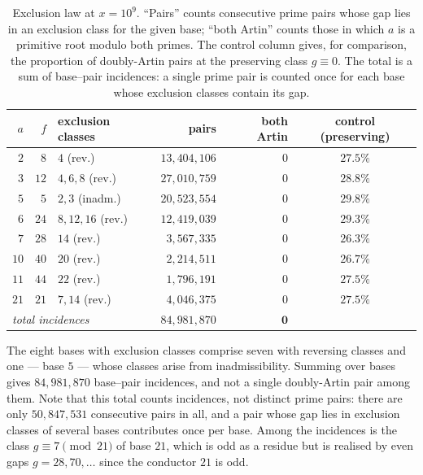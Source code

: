 \documentclass[11pt,reqno]{amsart}
\theoremstyle{plain}
\theoremstyle{definition}
\begin{document}
\begin{table}[t]
\centering
\caption{Exclusion law at $x = 10^9$. ``Pairs'' counts consecutive prime pairs
whose gap lies in an exclusion class for the given base; ``both Artin'' counts
those in which $a$ is a primitive root modulo both primes. The control column
gives, for comparison, the proportion of doubly-Artin pairs at the preserving
class $g \equiv 0$. The total is a sum of base--pair incidences: a single
prime pair is counted once for each base whose exclusion classes contain its
gap.}
\label{tab:verification}
\begin{tabular}{rrlrrc}
\toprule
$a$ & $f$ & exclusion classes & pairs & both Artin & control (preserving) \\
\midrule
$2$  & $8$  & $4$ (rev.)          & $13{,}404{,}106$ & $0$ & $27.5\%$ \\
$3$  & $12$ & $4, 6, 8$ (rev.)    & $27{,}010{,}759$ & $0$ & $28.8\%$ \\
$5$  & $5$  & $2, 3$ (inadm.)     & $20{,}523{,}554$ & $0$ & $29.8\%$ \\
$6$  & $24$ & $8, 12, 16$ (rev.)  & $12{,}419{,}039$ & $0$ & $29.3\%$ \\
$7$  & $28$ & $14$ (rev.)         & $3{,}567{,}335$  & $0$ & $26.3\%$ \\
$10$ & $40$ & $20$ (rev.)         & $2{,}214{,}511$  & $0$ & $26.7\%$ \\
$11$ & $44$ & $22$ (rev.)         & $1{,}796{,}191$  & $0$ & $27.5\%$ \\
$21$ & $21$ & $7, 14$ (rev.)      & $4{,}046{,}375$ & $0$ & $27.5\%$ \\
\midrule
\multicolumn{3}{l}{\emph{total incidences}} & $84{,}981{,}870$ & $\mathbf{0}$ & \\
\bottomrule
\end{tabular}
\end{table}

The eight bases with exclusion classes comprise seven with reversing classes
and one --- base $5$ --- whose classes arise from inadmissibility. Summing
over bases gives $84{,}981{,}870$ base--pair incidences, and not a single
doubly-Artin pair among them. Note that this total counts incidences, not
distinct prime pairs: there are only $50{,}847{,}531$ consecutive pairs in
all, and a pair whose gap lies in exclusion classes of several bases
contributes once per base. Among the incidences is the class $g \equiv 7
\pmod{21}$ of base $21$, which is odd as a residue but is realised by even
gaps $g = 28, 70, \dots$ since the conductor $21$ is odd.
\end{document}
